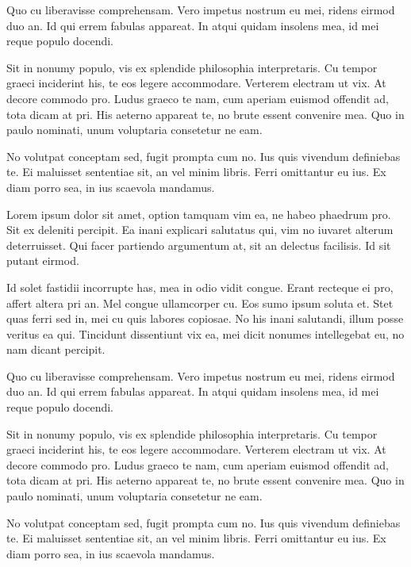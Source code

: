 Quo cu liberavisse comprehensam. Vero impetus nostrum eu mei, ridens eirmod duo an. Id qui errem fabulas appareat. In atqui quidam insolens mea, id mei reque populo docendi.

Sit in nonumy populo, vis ex splendide philosophia interpretaris. Cu tempor graeci inciderint his, te eos legere accommodare. Verterem electram ut vix. At decore commodo pro. Ludus graeco te nam, cum aperiam euismod offendit ad, tota dicam at pri. His aeterno appareat te, no brute essent convenire mea. Quo in paulo nominati, unum voluptaria consetetur ne eam.

No volutpat conceptam sed, fugit prompta cum no. Ius quis vivendum definiebas te. Ei maluisset sententiae sit, an vel minim libris. Ferri omittantur eu ius. Ex diam porro sea, in ius scaevola mandamus.

Lorem ipsum dolor sit amet, option tamquam vim ea, ne habeo phaedrum pro. Sit ex deleniti percipit. Ea inani explicari salutatus qui, vim no iuvaret alterum deterruisset. Qui facer partiendo argumentum at, sit an delectus facilisis. Id sit putant eirmod.

Id solet fastidii incorrupte has, mea in odio vidit congue. Erant recteque ei pro, affert altera pri an. Mel congue ullamcorper cu. Eos sumo ipsum soluta et. Stet quas ferri sed in, mei cu quis labores copiosae. No his inani salutandi, illum posse veritus ea qui. Tincidunt dissentiunt vix ea, mei dicit nonumes intellegebat eu, no nam dicant percipit.

Quo cu liberavisse comprehensam. Vero impetus nostrum eu mei, ridens eirmod duo an. Id qui errem fabulas appareat. In atqui quidam insolens mea, id mei reque populo docendi.

Sit in nonumy populo, vis ex splendide philosophia interpretaris. Cu tempor graeci inciderint his, te eos legere accommodare. Verterem electram ut vix. At decore commodo pro. Ludus graeco te nam, cum aperiam euismod offendit ad, tota dicam at pri. His aeterno appareat te, no brute essent convenire mea. Quo in paulo nominati, unum voluptaria consetetur ne eam.

No volutpat conceptam sed, fugit prompta cum no. Ius quis vivendum definiebas te. Ei maluisset sententiae sit, an vel minim libris. Ferri omittantur eu ius. Ex diam porro sea, in ius scaevola mandamus.
